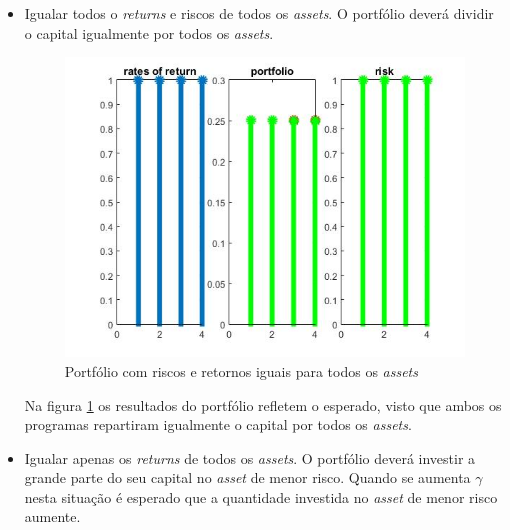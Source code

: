 \documentclass[a4paper]{IEEEtran}
\begin{document}
\begin{itemize}
No caso da figura \ref{fig:caso2.2}, o portfólio segue o mesmo padrão da figura \ref{fig:caso2.1}, aposta-se o capital nos \textit{assets} de menor risco e entre eles, investe-se a grande parte no \textit{asset} que apresenta maior retorno.
\vskip 4mm
\item Igualar todos o \textit{returns} e riscos de todos os \textit{assets}. O portfólio deverá dividir o capital igualmente por todos os \textit{assets}.

\begin{figure}[htp]
\captionsetup{font=scriptsize}  
  \centering
  \includegraphics[width=0.9\columnwidth]{./miu_igual}
  \caption{Portfólio com riscos e retornos iguais para todos os \textit{assets}}
  \label{fig:caso3}
\end{figure}
\vskip 4mm
Na figura \ref{fig:caso3} os resultados do portfólio refletem o esperado, visto que ambos os programas repartiram igualmente o capital por todos os \textit{assets}.
\vskip 4mm
\item Igualar apenas os \textit{returns} de todos os \textit{assets}. O portfólio deverá investir a grande parte do seu capital no \textit{asset} de menor risco. Quando se aumenta $\gamma$ nesta situação é esperado que a quantidade investida no \textit{asset} de menor risco aumente.


\end{itemize}
\end{document}
